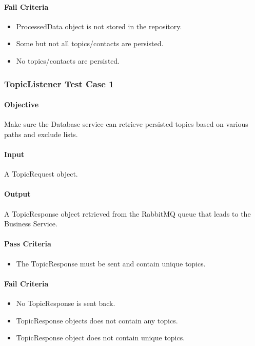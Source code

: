 \documentclass[hidelinks,english]{article}
\begin{document}
				\paragraph{Fail Criteria}
				\begin{itemize}
					\item ProcessedData object is not stored in the repository.
					\item Some but not all topics/contacts are persisted.
					\item No topics/contacts are persisted.
				\end{itemize}
				
			\subsubsection{TopicListener Test Case 1}\label{databasetopiclistenertest1}
				\paragraph{Objective} Make sure the Database service can retrieve persisted topics based on various paths and exclude lists.
				\paragraph{Input} A TopicRequest object.
				\paragraph{Output} A TopicResponse object retrieved from the RabbitMQ queue that leads to the Business Service.
				\paragraph{Pass Criteria}
				\begin{itemize}
					\item The TopicResponse must be sent and contain unique topics.
				\end{itemize}
				\paragraph{Fail Criteria}
				\begin{itemize}
					\item No TopicResponse is sent back.
					\item TopicResponse objects does not contain any topics.
					\item TopicResponse object does not contain unique topics.
				\end{itemize}
				
\end{document}
